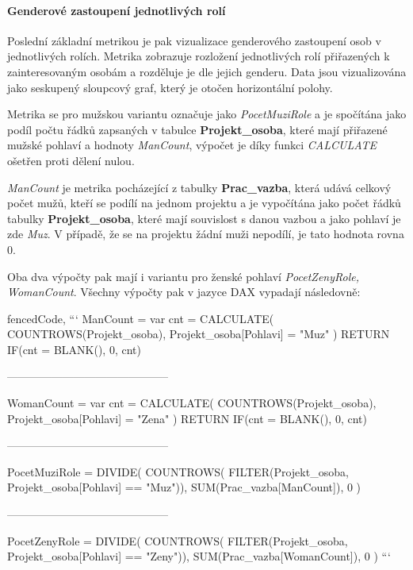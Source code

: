 \documentclass[
  digital,     %
  twoside,     %
  lof,         %
  lot,         %
]{fithesis4}
\begin{document}
\paragraph{Genderové zastoupení jednotlivých rolí}
Poslední základní metrikou je pak vizualizace genderového zastoupení osob v jednotlivých rolích. Metrika zobrazuje rozložení jednotlivých rolí přiřazených k zainteresovaným osobám a rozděluje je dle jejich genderu. Data jsou vizualizována jako seskupený sloupcový graf, který je otočen horizontální polohy.  

Metrika se pro mužskou variantu označuje jako \emph{PocetMuziRole} a je spočítána jako podíl počtu řádků zapsaných v tabulce \textbf{Projekt\_osoba}, které mají přiřazené mužské pohlaví a hodnoty \emph{ManCount}, výpočet je díky funkci \emph{CALCULATE} ošetřen proti dělení nulou.

\emph{ManCount} je metrika pocházející z tabulky \textbf{Prac\_vazba}, která udává celkový počet mužů, kteří se podílí na jednom projektu a je vypočítána jako počet řádků tabulky \textbf{Projekt\_osoba}, které mají souvislost s danou vazbou a jako pohlaví je zde \emph{Muz}. V případě, že se na projektu žádní muži nepodílí, je tato hodnota rovna 0.

Oba dva výpočty pak mají i variantu pro ženské pohlaví \emph{PocetZenyRole, WomanCount}. Všechny výpočty pak v jazyce DAX vypadají následovně:

\begin{markdown*}{%
  fencedCode,
}
```
ManCount = 
var cnt = CALCULATE(
    COUNTROWS(Projekt_osoba), Projekt_osoba[Pohlavi] = "Muz"
    ) 
RETURN IF(cnt = BLANK(), 0, cnt)

--------------------------------------------

WomanCount = 
var cnt = CALCULATE(
    COUNTROWS(Projekt_osoba), Projekt_osoba[Pohlavi] = "Zena"
    ) 
RETURN IF(cnt = BLANK(), 0, cnt)

--------------------------------------------

PocetMuziRole = DIVIDE(
        COUNTROWS(
            FILTER(Projekt_osoba, Projekt_osoba[Pohlavi] == "Muz")), 
                    SUM(Prac_vazba[ManCount]), 0
        )

--------------------------------------------

PocetZenyRole = DIVIDE(
        COUNTROWS(
            FILTER(Projekt_osoba, Projekt_osoba[Pohlavi] == "Zeny")),
                    SUM(Prac_vazba[WomanCount]), 0
        )
```
\end{markdown*}
\end{document}
